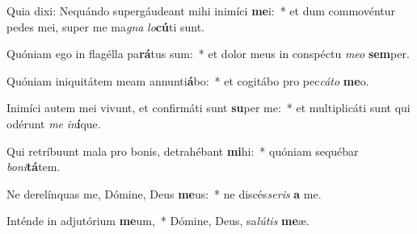 \item Quia dixi: Nequándo supergáudeant mihi inimíci \textbf{me}i:~* et dum commovéntur pedes mei, super me ma\textit{gna} \textit{lo}\textbf{cú}ti sunt.
\item Quóniam ego in flagélla pa\textbf{rá}tus sum:~* et dolor meus in conspéctu \textit{me}\textit{o} \textbf{sem}per.
\item Quóniam iniquitátem meam annunti\textbf{á}bo:~* et cogitábo pro pec\textit{cá}\textit{to} \textbf{me}o.
\item Inimíci autem mei vivunt, et confirmáti sunt \textbf{su}per me:~* et multiplicáti sunt qui odérunt \textit{me} \textit{in}\textbf{í}que.
\item Qui retríbuunt mala pro bonis, detrahébant \textbf{mi}hi:~* quóniam sequébar \textit{bo}\textit{ni}\textbf{tá}tem.
\item Ne derelínquas me, Dómine, Deus \textbf{me}us:~* ne discés\textit{se}\textit{ris} \textbf{a} me.
\item Inténde in adjutórium \textbf{me}um,~* Dómine, Deus, sa\textit{lú}\textit{tis} \textbf{me}æ.
